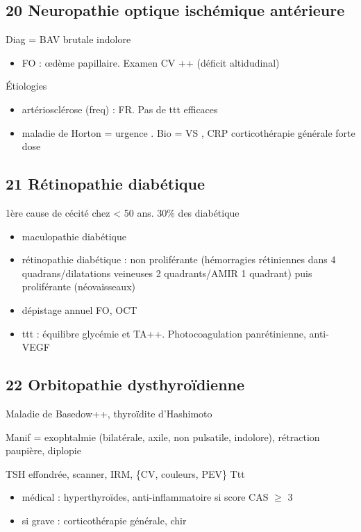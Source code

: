 \documentclass[11pt]{article}
\begin{document}
\subsection{20 Neuropathie optique ischémique antérieure}
\label{sec:org20b4246}
Diag = BAV brutale indolore
\begin{itemize}
\item FO : \oe{}dème papillaire. Examen CV ++ (déficit altidudinal)
\end{itemize}

Étiologies
\begin{itemize}
\item artériosclérose (freq) : FR. Pas de ttt efficaces
\item maladie de Horton = urgence \faBomb. Bio = VS \inc, CRP \inc \thus
corticothérapie générale forte dose
\end{itemize}
\subsection{21 Rétinopathie diabétique}
\label{sec:org9eb045f}
\label{orgb19a48c}
 1ère cause de cécité chez < 50 ans. 30\% des diabétique
\begin{itemize}
\item maculopathie diabétique
\item rétinopathie diabétique : non proliférante (hémorragies rétiniennes dans 4
quadrans/dilatations veineuses 2 quadrants/AMIR 1 quadrant) puis proliférante (néovaisseaux)
\item dépistage annuel FO, OCT
\item ttt : équilibre glycémie et TA++. Photocoagulation panrétinienne, anti-VEGF
\end{itemize}
\subsection{22 Orbitopathie dysthyroïdienne}
\label{sec:org9661f87}
Maladie de Basedow++, thyroïdite d'Hashimoto

Manif = exophtalmie (bilatérale, axile, non pulsatile, indolore), rétraction
paupière, diplopie

TSH effondrée, scanner, IRM, \{CV, couleurs, PEV\}
Ttt 
\begin{itemize}
\item médical : hyperthyroïdes, anti-inflammatoire si score CAS \(\ge\) 3
\item si grave : corticothérapie générale, chir
\end{itemize}
\end{document}
